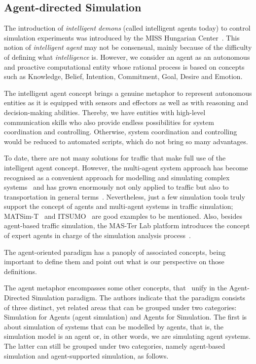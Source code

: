 \documentclass[conference]{IEEEtran}
\begin{document}
\subsection{Agent-directed Simulation}

The introduction of \textit{intelligent demons} (called intelligent agents today) to control simulation experiments was introduced by the MISS Hungarian Center~\cite{Javor2012}. This notion of \textit{intelligent agent} may not be consensual, mainly because of the difficulty of defining what \textit{intelligence} is. However, we consider an agent as an autonomous and proactive computational entity whose rational process is based on concepts such as Knowledge, Belief, Intention, Commitment, Goal, Desire and Emotion.

The intelligent agent concept brings a genuine metaphor to represent autonomous entities as it is equipped with sensors and effectors as well as with reasoning and decision-making abilities. Thereby, we have entities with high-level communication skills who also provide endless possibilities for system coordination and controlling. Otherwise, system coordination and controlling would be reduced to automated scripts, which do not bring so many advantages.

To date, there are not many solutions for traffic that make full use of the intelligent agent concept. However, the multi-agent system approach has become recognised as a convenient approach for modelling and simulating complex systems~\cite{moya2007towards} and has grown enormously not only applied to traffic but also to transportation in general terms~\cite{bazzan2013review}. Nevertheless, just a few simulation tools truly support the concept of agents and multi-agent systems in traffic simulation; MATSim-T~\cite{balmer2009matsim} and ITSUMO~\cite{bazzan2010itsumo} are good examples to be mentioned. Also, besides agent-based traffic simulation, the MAS-Ter Lab platform introduces the concept of expert agents in charge of the simulation analysis process~\cite{rossetti2007}.


The agent-oriented paradigm has a panoply of associated concepts, being important to define them and point out what is our perspective on those definitions.

The agent metaphor encompasses some other concepts, that~\cite{yilmaz2007agent} unify in the Agent-Directed Simulation paradigm. The authors indicate that the paradigm consists of three distinct, yet related areas that can be grouped under two categories: Simulation for Agents (agent simulation) and Agents for Simulation. The first is about simulation of systems that can be modelled by agents, that is, the simulation model is an agent or, in other words, we are simulating agent systems. The latter can still be grouped under two categories, namely agent-based simulation and agent-supported simulation, as follows.
\end{document}
